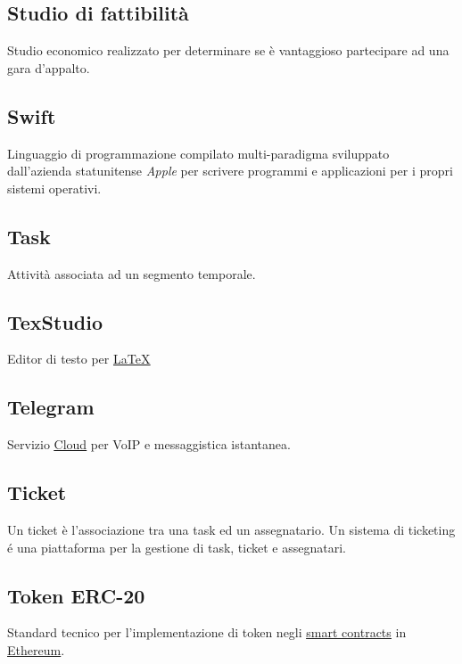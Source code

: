 	\subsection{Studio di fattibilità}
	\label{sec:studiofattibilita}
	Studio economico realizzato per determinare se è vantaggioso partecipare ad una gara d'appalto.
	
	\subsection{Swift}
	\label{sec:swift}
	Linguaggio di programmazione compilato multi-paradigma sviluppato dall'azienda statunitense \emph{Apple} per scrivere programmi e applicazioni per i propri sistemi operativi.

	\newpage

	
	\subsection{Task}
	\label{sec:texstudio}
	Attività associata ad un segmento temporale.
		
	
	\subsection{TexStudio}
	\label{sec:texstudio}
	Editor di testo per \underline{\hyperref[sec:latex]{LaTeX}}

	\subsection{Telegram}
	\label{sec:telegram}
	Servizio \underline{\hyperref[sec:cloud]{Cloud}} per VoIP e messaggistica istantanea.

	\subsection{Ticket}
	\label{sec:telegram}
	Un ticket è l'associazione tra una task ed un assegnatario. Un sistema di ticketing é una piattaforma per la gestione di task, ticket e assegnatari. 

	\subsection{Token ERC-20}
	\label{sec:erc20}
	Standard tecnico per l'implementazione di token negli  \underline{\hyperref[sec:smartcontracts]{smart contracts}} in  \underline{\hyperref[sec:ethereum]{Ethereum}}.


